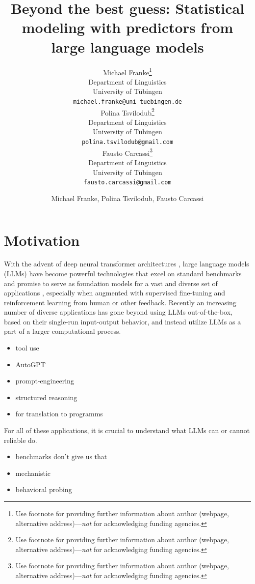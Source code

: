 \documentclass{article}
\title{Beyond the best guess: Statistical modeling with predictors from large language models}
\date{}
\author{ Michael Franke\thanks{Use footnote for providing further
		information about author (webpage, alternative
		address)---\emph{not} for acknowledging funding agencies.} \\
	Department of Linguistics\\
	University of Tübingen\\
	\texttt{michael.franke@uni-tuebingen.de} \\
	\And
	Polina Tsvilodub\thanks{Use footnote for providing further
		information about author (webpage, alternative
		address)---\emph{not} for acknowledging funding agencies.} \\
	Department of Linguistics\\
	University of Tübingen\\
	\texttt{polina.tsvilodub@gmail.com} \\
	\And
	Fausto Carcassi\thanks{Use footnote for providing further
		information about author (webpage, alternative
		address)---\emph{not} for acknowledging funding agencies.} \\
	Department of Linguistics\\
	University of Tübingen\\
	\texttt{fausto.carcassi@gmail.com} \\
}
\author{Michael Franke, Polina Tsvilodub, Fausto Carcassi}
\affil{Department of Linguistics\\University of Tübingen\\
\texttt{[michael.franke|polina.tsvilodub|fausto.carcassi]@uni-tuebingen.de}}
\begin{document}
\maketitle

\begin{abstract}
	{\textcolor{gray}{\lipsum[1]}}
\end{abstract}



\section{Motivation}
\label{motivation}

With the advent of deep neural transformer architectures \citep{VaswaniShazeer2017:Attention-is-Al}, large language models (LLMs) have become powerful technologies that excel on standard benchmarks and promise to serve as foundation models for a vast and diverse set of applications \citep{BommasaniHudson2021:On-the-opportun} \citep{DevlinChang2019:BERT:-Pre-train,ChungHou2022:Scaling-Instruc,OpenAI2023:GPT-4-Technical,TouvronLavril2023:LLaMA:-Open-and}, especially when augmented with supervised fine-tuning  \citep{ChungHou2022:Scaling-Instruc} and reinforcement learning from human \citep{StiennonOuyang2022:Learning-to-sum} or other \citep{BaiKadavath2022:Constitutional-} feedback.
Recently an increasing number of diverse applications has gone beyond using LLMs out-of-the-box, based on their single-run input-output behavior, and instead utilize LLMs as a part of a larger computational process.


\begin{itemize}
  \item tool use
  \item AutoGPT
  \item prompt-engineering
  \item structured reasoning
  \item for translation to programms \citep{WongGrand2023:From-Word-Model}
\end{itemize}

For all of these applications, it is crucial to understand what LLMs can or cannot reliable do.

\begin{itemize}
  \item benchmarks don't give us that
  \item mechanistic
  \item behavioral probing
\end{itemize}
\end{document}
